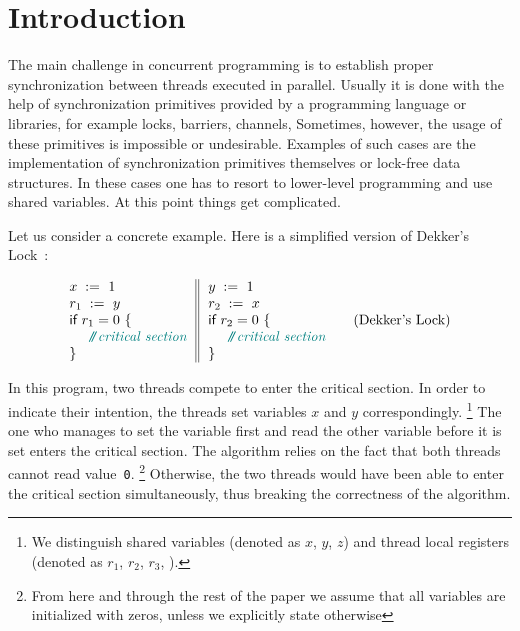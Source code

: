 \section{Introduction}
\label{sec:intro}

The main challenge in concurrent programming is 
to establish proper synchronization between threads executed in parallel.     
Usually it is done with the help of synchronization primitives
provided by a programming language or libraries,
for example locks, barriers, channels, \etc
Sometimes, however, the usage of these primitives is impossible or undesirable. 
Examples of such cases are the implementation 
of synchronization primitives themselves
or lock-free data structures.
In these cases one has to resort to 
lower-level programming and use shared variables. 
At this point things get complicated.


Let us consider a concrete example.
Here is a simplified version of Dekker's Lock~\cite{Dijkstra:68}:

\begin{equation*}
\inarrII{
  \writeInst{}{x}{1} \\
  \readInst{}{r_1}{y}  \\
  \kw{if} {r_1 = 0} ~\{ \\
  ~~ \comment{critical section} \\
  \}
}{
  \writeInst{}{y}{1} \\
  \readInst{}{r_2}{x}  \\
  \kw{if} {r_2 = 0} ~\{ \\
  ~~ \comment{critical section} \\
  \}
}
\tag{Dekker's Lock}\label{ex:Dekker}
\end{equation*}

In this program, two threads compete to enter the critical section.
In order to indicate their intention, the threads set 
variables $x$ and $y$ correspondingly.%
\footnote{We distinguish shared variables 
(denoted as $x$, $y$, $z$) and thread local registers 
(denoted as $r_1$, $r_2$, $r_3$, \etc).}
The one who manages to set the variable first 
and read the other variable before it is set
enters the critical section.
The algorithm relies on the fact that both threads cannot read value~\texttt{0}.%
\footnote{From here and through the rest of the paper we assume that all 
variables are initialized with zeros, unless we explicitly state otherwise}
Otherwise, the two threads would have been able 
to enter the critical section simultaneously, 
thus breaking the correctness of the algorithm.

